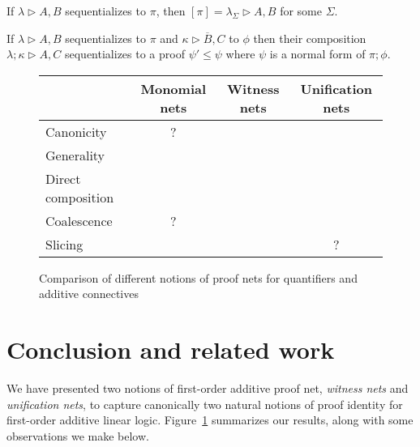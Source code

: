 \documentclass[UKenglish]{lipics-v2019}
\newcommand\xmark{{\color{red}\ding{55}}}
\newcommand\vmark{{\color{green}\ding{51}}}
\newcommand\+{+}
\renewcommand\*{\times}
\newcommand\dual[1]{\overline{#1}}
\newcommand\net[3]{#1\triangleright #2,#3}
\newcommand\comp{\mathbin;}
\begin{document}
\begin{theorem}
\label{thm:unet seq-deseq}
If $\net\lambda AB$ sequentializes to $\pi$, then $[\pi]=\net{\lambda_\Sigma} AB$ for some $\Sigma$.
\end{theorem}


\begin{theorem}
\label{thm:unet composition}
If $\net\lambda AB$ sequentializes to $\pi$ and $\net\kappa{\dual B}C$ to $\phi$ then their composition $\net{\lambda\comp\kappa}AC$ sequentializes to a proof $\psi'\leq\psi$ where $\psi$ is a normal form of $\pi\comp\phi$.
\end{theorem}

\begin{figure}[!t]
\begin{center}
\begin{tabular}{lccc}
 &	Monomial nets & Witness nets & Unification nets
\\\hline
   Canonicity          &    ?   & \vmark & \vmark
\\ Generality          & \xmark & \xmark & \vmark
\\ Direct composition  & \xmark & \vmark & \vmark
\\ Coalescence         &    ?   & \vmark & \vmark
\\ Slicing             & \vmark & \vmark &   ?
\end{tabular}  
  \caption{Comparison of different notions of proof nets for quantifiers and additive connectives}
  \label{fig:results}
\end{center}
\vskip-8pt
\end{figure}


\section{Conclusion and related work}

We have presented two notions of first-order additive proof net, \emph{witness nets} and \emph{unification nets}, to capture canonically two natural notions of proof identity for first-order additive linear logic. Figure~\ref{fig:results} summarizes our results, along with some observations we make below. 
\end{document}
